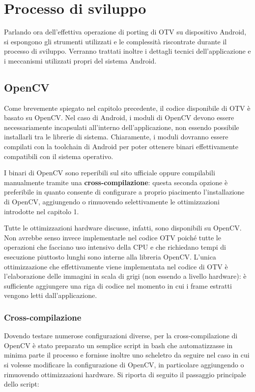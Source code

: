 \chapter{Processo di sviluppo}

Parlando ora dell'effettiva operazione di porting di OTV su dispositivo Android, si espongono gli strumenti utilizzati
e le complessità riscontrate durante il processo di sviluppo. Verranno trattati inoltre i dettagli tecnici dell'applicazione
e i meccanismi utilizzati propri del sistema Android.

\section{OpenCV}

Come brevemente spiegato nel capitolo precedente, il codice disponibile di OTV è basato su OpenCV.
Nel caso di Android, i moduli di OpenCV devono essere necessariamente incapsulati all'interno dell'applicazione, non essendo
possibile installarli tra le librerie di sistema. Chiaramente, i moduli dovranno essere compilati con la toolchain di Android
per poter ottenere binari effettivamente compatibili con il sistema operativo.

I binari di OpenCV sono reperibili sul sito ufficiale oppure compilabili manualmente tramite una
\textbf{cross-compilazione}: questa seconda opzione è preferibile in quanto consente di configurare a proprio piacimento
l'installazione di OpenCV, aggiungendo o rimuovendo selettivamente le ottimizzazioni introdotte nel capitolo 1.

Tutte le ottimizzazioni hardware discusse, infatti, sono disponibili su OpenCV. 
Non avrebbe senso invece implementarle nel codice OTV poiché tutte le operazioni che facciano uso intensivo della CPU e 
che richiedano tempi di esecuzione piuttosto lunghi sono interne alla libreria OpenCV.
L'unica ottimizzazione che effettivamente viene implementata nel codice di OTV è l'elaborazione delle immagini in scala di
grigi (non essendo a livello hardware): è sufficiente aggiungere una riga di codice nel momento in cui i frame estratti vengono
letti dall'applicazione.

\subsection{Cross-compilazione}

Dovendo testare numerose configurazioni diverse, per la cross-compilazione di OpenCV è stato preparato un semplice script 
in bash che automatizzasse in minima parte il processo e fornisse inoltre uno scheletro da seguire nel caso in cui si 
volesse modificare la configurazione di OpenCV, in particolare aggiungendo o rimuovendo ottimizzazioni hardware. 
Si riporta di seguito il passaggio principale dello script:

